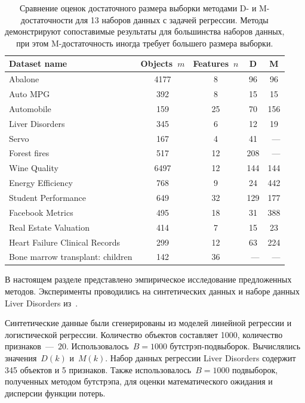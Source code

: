 \begin{table}[h!t]\center
    \caption{Сравнение оценок достаточного размера выборки методами D- и M-достаточности для 13 наборов данных с задачей регрессии. Методы демонстрируют сопоставимые результаты для большинства наборов данных, при этом M-достаточность иногда требует большего размера выборки.}\label{chapter:samplesize:experiment:likelihood-bootstraping:table}
    \begin{tabular}{|l|c|c|c|c|}
    \hline
    Dataset name & Objects~$m$ & Features~$n$ & D & M \\
    \hline
    Abalone & 4177 & 8 & 96 & 96  \\
    Auto MPG & 392 & 8 & 15 & 15 \\
    Automobile & 159 & 25 & 70 & 156  \\
    Liver Disorders & 345 & 6 & 12 & 19  \\
    Servo & 167 & 4 & 41 &~---  \\
    Forest fires & 517 & 12 & 208 &~--- \\
    Wine Quality & 6497 & 12 & 144 & 144  \\
    Energy Efficiency & 768 & 9 & 24 & 442  \\
    Student Performance & 649 & 32 & 129 & 177  \\
    Facebook Metrics & 495 & 18 & 31 & 388   \\
    Real Estate Valuation & 414 & 7 & 15 & 23  \\
    Heart Failure Clinical Records & 299 & 12 & 63 & 224  \\
    Bone marrow transplant: children & 142 & 36 &~--- &~--- \\
    \hline
    \end{tabular}
\end{table}

В настоящем разделе представлено эмпирическое исследование предложенных методов. Эксперименты проводились на синтетических данных и наборе данных Liver Disorders из~\cite{uci}.

Синтетические данные были сгенерированы из моделей линейной регрессии и логистической регрессии. Количество объектов составляет 1000, количество признаков~---~$20$.
Использовалось~$B=1000$ бутстрэп-подвыборок.
Вычислялись значения~$D(k)$ и~$M(k)$.
Набор данных регрессии Liver Disorders содержит 345 объектов и 5 признаков.
Также использовалось~$B=1000$ подвыборок, полученных методом бутстрэпа, для оценки математического ожидания и дисперсии функции потерь.

